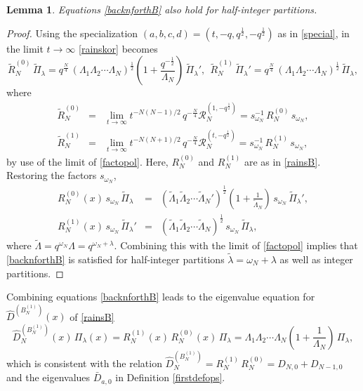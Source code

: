 \documentclass[12pt]{amsart}
\newtheorem{lemma}[thm]{Lemma}
\newcommand{\barD}{\bar D}
\newcommand{\lL}{{\Lambda}}
\newcommand{\half}{\frac{1}{2}}
\numberwithin{equation}{section}
\begin{document}
\begin{lemma}
Equations \eqref{backnforthB} also hold for half-integer partitions.
\end{lemma}
\begin{proof}
Using the specialization $(a,b,c,d)=(t,-q,q^\half,-q^\half)$ as in \eqref{special},
%
%
in the limit $t\to\infty$ \eqref{rainskor} becomes
$$
\tilde R^{(0)}_N\, \tilde \Pi_\lambda=q^{\frac{N}{4}}\, (\lL_1\lL_2\cdots \lL_N)^\half \left( 1+\frac{q^{-\half}}{\lL_N}\right)\, \tilde \Pi_\lambda',\ \
\tilde R^{(1)}_N\, \tilde \Pi_\lambda' =q^{\frac{N}{4}}\, (\lL_1\lL_2\cdots \lL_N)^\half \, \tilde \Pi_\lambda,
$$
where 
\begin{eqnarray*}
\tilde R^{(0)}_N&=&\lim_{t\to\infty} t^{-N(N-1)/2} \,q^{-\frac{N}{4}} \mathcal R^{(1,-q^\half)}_N= s_{\omega_N}^{-1}\, R_N^{(0)} \,s_{\omega_N},\\
\tilde R^{(1)}_N&=&\lim_{t\to\infty} t^{-N(N+1)/2}\, q^{-\frac{N}{4}} \mathcal R^{(t,-q^\half)}_N=s_{\omega_N}^{-1}\, R_N^{(1)} \,s_{\omega_N},
\end{eqnarray*}
by use of the limit of \eqref{factopol}. Here,
$R_N^{(0)}$ and $R_N^{(1)}$ are as in \eqref{rainsB}. Restoring the factors $s_{\omega_N}$, 
\begin{eqnarray*}
R_{N}^{(0)}(x)\,s_{\omega_N}\,\tilde \Pi_\lambda&=&(\tilde \lL_1\tilde \lL_2\cdots \tilde\lL_N')^\half \left(1+\frac{1}{\tilde\lL_N}\right) \,s_{\omega_N}\, 
\tilde\Pi_\lambda',\nonumber \\
R_{N}^{(1)}(x)\,s_{\omega_N}\,\tilde \Pi_\lambda'&=&(\tilde\lL_1\tilde\lL_2\cdots \tilde\lL_N)^\half\,s_{\omega_N}\, 
 \tilde\Pi_\lambda, 
\end{eqnarray*}
where $\tilde\lL=q^{\omega_N}\lL=q^{\omega_N+\lambda}$. Combining this with the limit of \eqref{factopol} implies that \eqref{backnforthB}  is satisfied for half-integer partitions $\tilde\lambda=\omega_N+\lambda$ as well as integer partitions.
\end{proof}

Combining equations \eqref{backnforthB} leads to the eigenvalue equation for $\hat D^{(B_N^{(1)})}(x)$ of \eqref{rainsB}
$$\hat D_N^{(B_N^{(1)})}(x)\, \Pi_\lambda(x)=R_{N}^{(1)}(x)\,R_{N}^{(0)}(x)\, \Pi_\lambda=\lL_1\lL_2\cdots \lL_N \left(1+\frac{1}{\lL_N}\right) \, \Pi_\lambda ,$$
which is consistent with the relation $\hat D_N^{(B_N^{(1)})}=R_{N}^{(1)}\,R_{N}^{(0)}=D_{N,0}+D_{N-1,0}$ and the eigenvalues $\barD_{a,0}$ in  Definition \eqref{firstdefops}.
\end{document}
